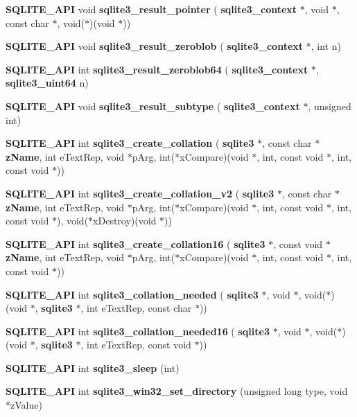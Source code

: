 \begin{DoxyCompactItemize}
\item 
\textbf{ S\+Q\+L\+I\+T\+E\+\_\+\+A\+PI} void \textbf{ sqlite3\+\_\+result\+\_\+pointer} (\textbf{ sqlite3\+\_\+context} $\ast$, void $\ast$, const char $\ast$, void($\ast$)(void $\ast$))
\item 
\textbf{ S\+Q\+L\+I\+T\+E\+\_\+\+A\+PI} void \textbf{ sqlite3\+\_\+result\+\_\+zeroblob} (\textbf{ sqlite3\+\_\+context} $\ast$, int n)
\item 
\textbf{ S\+Q\+L\+I\+T\+E\+\_\+\+A\+PI} int \textbf{ sqlite3\+\_\+result\+\_\+zeroblob64} (\textbf{ sqlite3\+\_\+context} $\ast$, \textbf{ sqlite3\+\_\+uint64} n)
\item 
\textbf{ S\+Q\+L\+I\+T\+E\+\_\+\+A\+PI} void \textbf{ sqlite3\+\_\+result\+\_\+subtype} (\textbf{ sqlite3\+\_\+context} $\ast$, unsigned int)
\item 
\textbf{ S\+Q\+L\+I\+T\+E\+\_\+\+A\+PI} int \textbf{ sqlite3\+\_\+create\+\_\+collation} (\textbf{ sqlite3} $\ast$, const char $\ast$\textbf{ z\+Name}, int e\+Text\+Rep, void $\ast$p\+Arg, int($\ast$x\+Compare)(void $\ast$, int, const void $\ast$, int, const void $\ast$))
\item 
\textbf{ S\+Q\+L\+I\+T\+E\+\_\+\+A\+PI} int \textbf{ sqlite3\+\_\+create\+\_\+collation\+\_\+v2} (\textbf{ sqlite3} $\ast$, const char $\ast$\textbf{ z\+Name}, int e\+Text\+Rep, void $\ast$p\+Arg, int($\ast$x\+Compare)(void $\ast$, int, const void $\ast$, int, const void $\ast$), void($\ast$x\+Destroy)(void $\ast$))
\item 
\textbf{ S\+Q\+L\+I\+T\+E\+\_\+\+A\+PI} int \textbf{ sqlite3\+\_\+create\+\_\+collation16} (\textbf{ sqlite3} $\ast$, const void $\ast$\textbf{ z\+Name}, int e\+Text\+Rep, void $\ast$p\+Arg, int($\ast$x\+Compare)(void $\ast$, int, const void $\ast$, int, const void $\ast$))
\item 
\textbf{ S\+Q\+L\+I\+T\+E\+\_\+\+A\+PI} int \textbf{ sqlite3\+\_\+collation\+\_\+needed} (\textbf{ sqlite3} $\ast$, void $\ast$, void($\ast$)(void $\ast$, \textbf{ sqlite3} $\ast$, int e\+Text\+Rep, const char $\ast$))
\item 
\textbf{ S\+Q\+L\+I\+T\+E\+\_\+\+A\+PI} int \textbf{ sqlite3\+\_\+collation\+\_\+needed16} (\textbf{ sqlite3} $\ast$, void $\ast$, void($\ast$)(void $\ast$, \textbf{ sqlite3} $\ast$, int e\+Text\+Rep, const void $\ast$))
\item 
\textbf{ S\+Q\+L\+I\+T\+E\+\_\+\+A\+PI} int \textbf{ sqlite3\+\_\+sleep} (int)
\item 
\textbf{ S\+Q\+L\+I\+T\+E\+\_\+\+A\+PI} int \textbf{ sqlite3\+\_\+win32\+\_\+set\+\_\+directory} (unsigned long type, void $\ast$z\+Value)

\end{DoxyCompactItemize}
